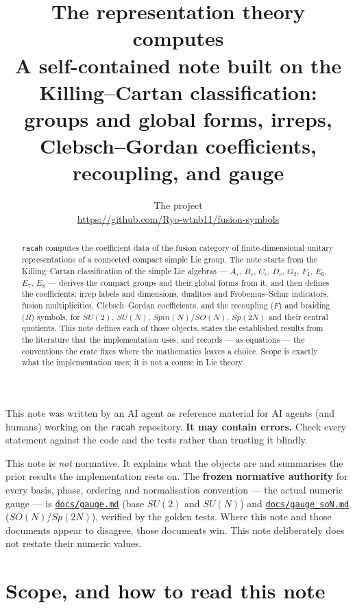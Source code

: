 \documentclass[11pt,a4paper]{article}
\title{\textbf{The representation theory \code{racah} computes}\\[0.3em]
\large A self-contained note built on the Killing--Cartan classification:\\
groups and global forms, irreps, Clebsch--Gordan coefficients,\\
recoupling, and gauge}
\author{The \code{racah} project \\ \small\url{https://github.com/Ryo-wtnb11/fusion-symbols}}
\date{}
\theoremstyle{plain}
\theoremstyle{definition}
\newcommand{\code}[1]{\texttt{#1}}
\newcommand{\gaugemd}{\href{https://github.com/Ryo-wtnb11/fusion-symbols/blob/main/docs/gauge.md}{\code{docs/gauge.md}}}
\newcommand{\gaugeson}{\href{https://github.com/Ryo-wtnb11/fusion-symbols/blob/main/docs/gauge_soN.md}{\code{docs/gauge\_soN.md}}}
\begin{document}
\maketitle
\thispagestyle{plain}

\begin{tcolorbox}[colback=yellow!8!white,colframe=orange!70!black,
  title=\textbf{Notice: AI-generated document}]
This note was written by an AI agent as reference material for AI agents (and
humans) working on the \code{racah} repository. \textbf{It may contain errors.}
Check every statement against the code and the tests rather than trusting it
blindly.

\medskip
This note is \emph{not} normative. It explains what the objects are and
summarises the prior results the implementation rests on. The \textbf{frozen
normative authority} for every basis, phase, ordering and normalisation
convention --- the actual numeric gauge --- is \gaugemd{} (base $SU(2)$ and
$SU(N)$) and \gaugeson{} ($SO(N)$/$Sp(2N)$), verified by the golden tests.
Where this note and those documents appear to disagree, those documents win.
This note deliberately does not restate their numeric values.
\end{tcolorbox}

\begin{abstract}
\noindent
\code{racah} computes the coefficient data of the fusion category of
finite-dimensional unitary representations of a connected compact simple Lie
group. The note starts from the Killing--Cartan classification of the simple
Lie algebras --- $A_r$, $B_r$, $C_r$, $D_r$, $G_2$, $F_4$, $E_6$, $E_7$, $E_8$
--- derives the compact groups and their global forms from it, and then defines
the coefficients: irrep labels and dimensions, dualities and Frobenius--Schur
indicators,
fusion multiplicities, Clebsch--Gordan coefficients, and the recoupling
($F$) and braiding ($R$) symbols, for $SU(2)$, $SU(N)$, $Spin(N)/SO(N)$,
$Sp(2N)$ and their central quotients. This note defines each of those objects,
states the established results from the literature that the implementation
uses, and records --- as equations --- the conventions the crate fixes where the
mathematics leaves a choice. Scope is exactly what the implementation uses; it
is not a course in Lie theory.
\end{abstract}

\tableofcontents
\bigskip

\section{Scope, and how to read this note}
\end{document}
